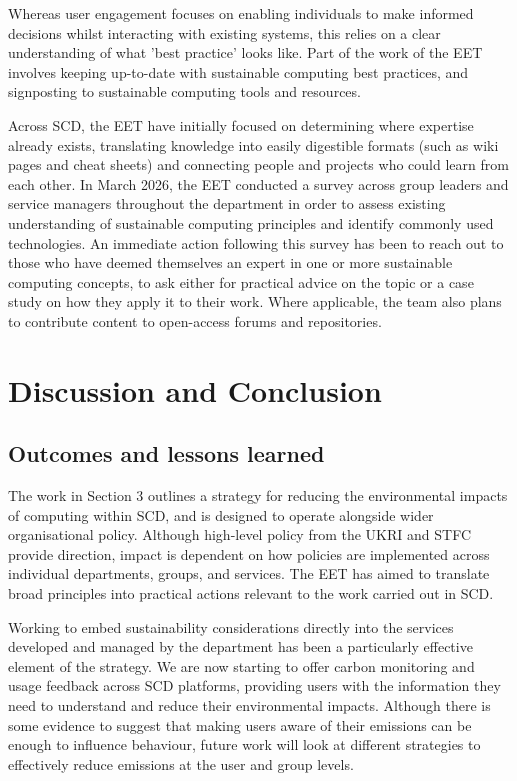 \documentclass[sigconf]{acmart}
\begin{document}
Whereas user engagement focuses on enabling individuals to make informed decisions whilst interacting with existing systems, this relies on a clear understanding of what 'best practice' looks like. Part of the work of the EET involves keeping up-to-date with sustainable computing best practices, and signposting to sustainable computing tools and resources. 

Across SCD, the EET have initially focused on determining where expertise already exists, translating knowledge into easily digestible formats (such as wiki pages and cheat sheets) and connecting people and projects who could learn from each other. In March 2026, the EET conducted a survey across group leaders and service managers throughout the department in order to assess existing understanding of sustainable computing principles and identify commonly used technologies. An immediate action following this survey has been to reach out to those who have deemed themselves an expert in one or more sustainable computing concepts, to ask either for practical advice on the topic or a case study on how they apply it to their work. Where applicable, the team also plans to contribute content to open-access forums and repositories.

\section{Discussion and Conclusion}
\subsection{Outcomes and lessons learned}
The work in Section 3 outlines a strategy for reducing the environmental impacts of computing within SCD, and is designed to operate alongside wider organisational policy. Although high-level policy from the UKRI and STFC provide direction, impact is dependent on how policies are implemented across individual departments, groups, and services. The EET has aimed to translate broad principles into practical actions relevant to the work carried out in SCD.

Working to embed sustainability considerations directly into the services developed and managed by the department has been a particularly effective element of the strategy. We are now starting to offer carbon monitoring and usage feedback across SCD platforms, providing users with the information they need to understand and reduce their environmental impacts. Although there is some evidence to suggest that making users aware of their emissions can be enough to influence behaviour\cite{UserEmissionsStudy}, future work will look at different strategies to effectively reduce emissions at the user and group levels.
\end{document}
